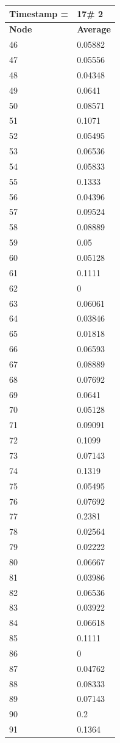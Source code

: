 \begin{tabular}{|l||l|}
\hline
\textbf{Timestamp =} & \textbf{17}\# 2\\\hline
	\textbf{Node} & \textbf{Average} \\ \hline
\hline
	46 & 0.05882 \\ \hline
	47 & 0.05556 \\ \hline
	48 & 0.04348 \\ \hline
	49 & 0.0641 \\ \hline
	50 & 0.08571 \\ \hline
	51 & 0.1071 \\ \hline
	52 & 0.05495 \\ \hline
	53 & 0.06536 \\ \hline
	54 & 0.05833 \\ \hline
	55 & 0.1333 \\ \hline
	56 & 0.04396 \\ \hline
	57 & 0.09524 \\ \hline
	58 & 0.08889 \\ \hline
	59 & 0.05 \\ \hline
	60 & 0.05128 \\ \hline
	61 & 0.1111 \\ \hline
	62 & 0 \\ \hline
	63 & 0.06061 \\ \hline
	64 & 0.03846 \\ \hline
	65 & 0.01818 \\ \hline
	66 & 0.06593 \\ \hline
	67 & 0.08889 \\ \hline
	68 & 0.07692 \\ \hline
	69 & 0.0641 \\ \hline
	70 & 0.05128 \\ \hline
	71 & 0.09091 \\ \hline
	72 & 0.1099 \\ \hline
	73 & 0.07143 \\ \hline
	74 & 0.1319 \\ \hline
	75 & 0.05495 \\ \hline
	76 & 0.07692 \\ \hline
	77 & 0.2381 \\ \hline
	78 & 0.02564 \\ \hline
	79 & 0.02222 \\ \hline
	80 & 0.06667 \\ \hline
	81 & 0.03986 \\ \hline
	82 & 0.06536 \\ \hline
	83 & 0.03922 \\ \hline
	84 & 0.06618 \\ \hline
	85 & 0.1111 \\ \hline
	86 & 0 \\ \hline
	87 & 0.04762 \\ \hline
	88 & 0.08333 \\ \hline
	89 & 0.07143 \\ \hline
	90 & 0.2 \\ \hline
	91 & 0.1364 \\ \hline
\end{tabular}
